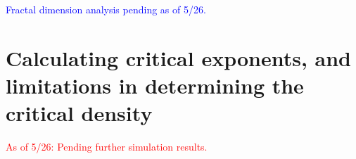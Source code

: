 \textcolor{blue}{
Fractal dimension analysis pending as of 5/26.
}




\section{Calculating critical exponents, and limitations in determining the critical density}
\textcolor{red}{As of 5/26: Pending further simulation results.}


